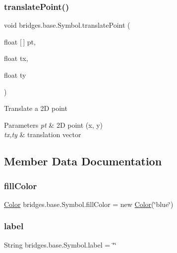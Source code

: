 \subsubsection{\texorpdfstring{translate\+Point()}{translatePoint()}}
{\footnotesize\ttfamily void bridges.\+base.\+Symbol.\+translate\+Point (\begin{DoxyParamCaption}\item[{float \mbox{[}$\,$\mbox{]}}]{pt,  }\item[{float}]{tx,  }\item[{float}]{ty }\end{DoxyParamCaption})\hspace{0.3cm}{\ttfamily [protected]}}

Translate a 2D point 
\begin{DoxyParams}{Parameters}
{\em pt} & 2D point (x, y) \\
\hline
{\em tx,ty} & translation vector \\
\hline
\end{DoxyParams}


\subsection{Member Data Documentation}
\mbox{\label{classbridges_1_1base_1_1_symbol_a44f00712b6c584c7778ed9de4c394cbf}} 
\subsubsection{\texorpdfstring{fill\+Color}{fillColor}}
{\footnotesize\ttfamily \hyperlink{classbridges_1_1base_1_1_color}{Color} bridges.\+base.\+Symbol.\+fill\+Color = new \hyperlink{classbridges_1_1base_1_1_color}{Color}(\char`\"{}blue\char`\"{})\hspace{0.3cm}{\ttfamily [protected]}}

\mbox{\label{classbridges_1_1base_1_1_symbol_ad2adcc82e6a96c2f3c465702502655e9}} 
\subsubsection{\texorpdfstring{label}{label}}
{\footnotesize\ttfamily String bridges.\+base.\+Symbol.\+label = \char`\"{}\char`\"{}\hspace{0.3cm}{\ttfamily [protected]}}

